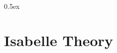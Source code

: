 \documentclass[a4paper,enabledeprecatedfontcommands]{scrreprt}
\numberwithin{remark}{chapter}
\numberwithin{TODO}{chapter}
\begin{document}
\parindent 0pt\parskip 0.5ex




\appendix
\chapter{Isabelle Theory}













\restoregeometry



\end{document}
